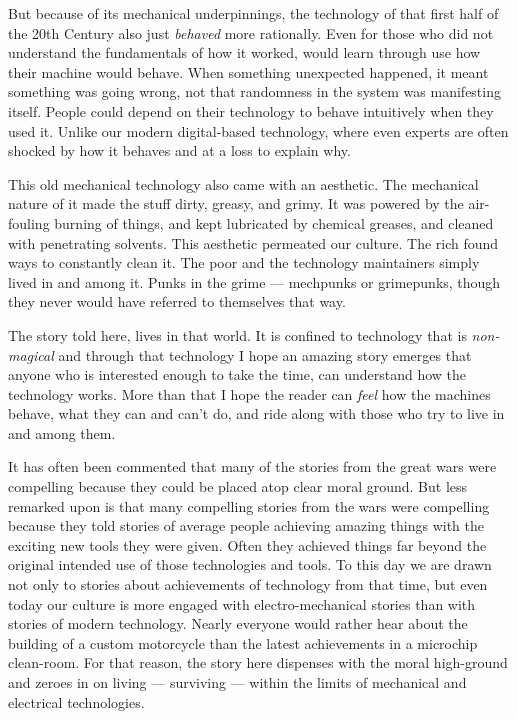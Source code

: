 \documentclass[]{article}
\begin{document}
But because of its mechanical underpinnings, the technology of that
first half of the 20th Century also just \emph{behaved} more rationally.
Even for those who did not understand the fundamentals of how it worked,
would learn through use how their machine would behave. When something
unexpected happened, it meant something was going wrong, not that
randomness in the system was manifesting itself. People could depend on
their technology to behave intuitively when they used it. Unlike our
modern digital-based technology, where even experts are often shocked by
how it behaves and at a loss to explain why.

This old mechanical technology also came with an aesthetic. The
mechanical nature of it made the stuff dirty, greasy, and grimy. It was
powered by the air-fouling burning of things, and kept lubricated by
chemical greases, and cleaned with penetrating solvents. This aesthetic
permeated our culture. The rich found ways to constantly clean it. The
poor and the technology maintainers simply lived in and among it. Punks
in the grime --- mechpunks or grimepunks, though they never would have
referred to themselves that way.

The story told here, lives in that world. It is confined to technology
that is \emph{non-magical} and through that technology I hope an amazing
story emerges that anyone who is interested enough to take the time, can
understand how the technology works. More than that I hope the reader
can \emph{feel} how the machines behave, what they can and can't do, and
ride along with those who try to live in and among them.

It has often been commented that many of the stories from the great wars
were compelling because they could be placed atop clear moral ground.
But less remarked upon is that many compelling stories from the wars
were compelling because they told stories of average people achieving
amazing things with the exciting new tools they were given. Often they
achieved things far beyond the original intended use of those
technologies and tools. To this day we are drawn not only to stories
about achievements of technology from that time, but even today our
culture is more engaged with electro-mechanical stories than with
stories of modern technology. Nearly everyone would rather hear about
the building of a custom motorcycle than the latest achievements in a
microchip clean-room. For that reason, the story here dispenses with the
moral high-ground and zeroes in on living --- surviving --- within the
limits of mechanical and electrical technologies.
\end{document}
